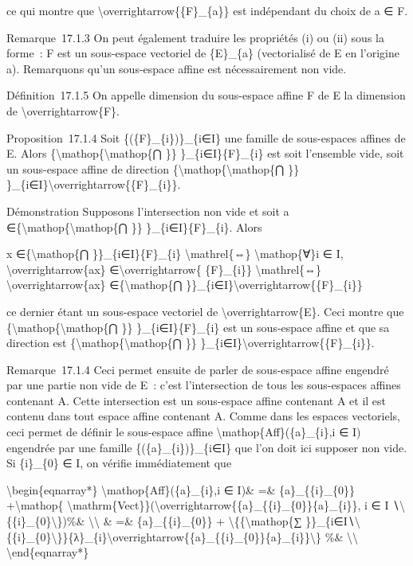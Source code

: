\documentclass[]{article}
\begin{document}
ce qui montre que \textbackslash{}overrightarrow\{\{F\}\_\{a\}\} est
indépendant du choix de a ∈ F.

Remarque~17.1.3 On peut également traduire les propriétés (i) ou (ii)
sous la forme~: F est un sous-espace vectoriel de \{E\}\_\{a\}
(vectorialisé de E en l'origine a). Remarquons qu'un sous-espace affine
est nécessairement non vide.

Définition~17.1.5 On appelle dimension du sous-espace affine F de E la
dimension de \textbackslash{}overrightarrow\{F\}.

Proposition~17.1.4 Soit \{(\{F\}\_\{i\})\}\_\{i∈I\} une famille de
sous-espaces affines de E. Alors
\{\textbackslash{}mathop\{\textbackslash{}mathop\{⋂ \}\}
\}\_\{i∈I\}\{F\}\_\{i\} est soit l'ensemble vide, soit un sous-espace
affine de direction \{\textbackslash{}mathop\{\textbackslash{}mathop\{⋂
\}\} \}\_\{i∈I\}\textbackslash{}overrightarrow\{\{F\}\_\{i\}\}.

Démonstration Supposons l'intersection non vide et soit a
∈\{\textbackslash{}mathop\{\textbackslash{}mathop\{⋂ \}\}
\}\_\{i∈I\}\{F\}\_\{i\}. Alors

x ∈\{\textbackslash{}mathop\{⋂ \}\}\_\{i∈I\}\{F\}\_\{i\}
\textbackslash{}mathrel\{⇔\} \textbackslash{}mathop\{∀\}i ∈ I,
\textbackslash{}overrightarrow\{ax\} ∈\textbackslash{}overrightarrow\{
\{F\}\_\{i\}\} \textbackslash{}mathrel\{⇔\}
\textbackslash{}overrightarrow\{ax\} ∈\{\textbackslash{}mathop\{⋂
\}\}\_\{i∈I\}\textbackslash{}overrightarrow\{\{F\}\_\{i\}\}

ce dernier étant un sous-espace vectoriel de
\textbackslash{}overrightarrow\{E\}. Ceci montre que
\{\textbackslash{}mathop\{\textbackslash{}mathop\{⋂ \}\}
\}\_\{i∈I\}\{F\}\_\{i\} est un sous-espace affine et que sa direction
est \{\textbackslash{}mathop\{\textbackslash{}mathop\{⋂ \}\}
\}\_\{i∈I\}\textbackslash{}overrightarrow\{\{F\}\_\{i\}\}.

Remarque~17.1.4 Ceci permet ensuite de parler de sous-espace affine
engendré par une partie non vide de E~: c'est l'intersection de tous les
sous-espaces affines contenant A. Cette intersection est un sous-espace
affine contenant A et il est contenu dans tout espace affine contenant
A. Comme dans les espaces vectoriels, ceci permet de définir le
sous-espace affine \textbackslash{}mathop\{Aff\}(\{a\}\_\{i\},i ∈ I)
engendrée par une famille \{(\{a\}\_\{i\})\}\_\{i∈I\} que l'on doit ici
supposer non vide. Si \{i\}\_\{0\} ∈ I, on vérifie immédiatement que

\textbackslash{}begin\{eqnarray*\}
\textbackslash{}mathop\{Aff\}(\{a\}\_\{i\},i ∈ I)\& =\&
\{a\}\_\{\{i\}\_\{0\}\} +\textbackslash{}mathop\{
\textbackslash{}mathrm\{Vect\}\}(\textbackslash{}overrightarrow\{\{a\}\_\{\{i\}\_\{0\}\}\{a\}\_\{i\}\},
i ∈ I ∖\textbackslash{}\{\{i\}\_\{0\}\textbackslash{}\})\%\&
\textbackslash{}\textbackslash{} \& =\& \{a\}\_\{\{i\}\_\{0\}\} +
\textbackslash{}\{\{\textbackslash{}mathop\{∑
\}\}\_\{i∈I∖\textbackslash{}\{\{i\}\_\{0\}\textbackslash{}\}\}\{λ\}\_\{i\}\textbackslash{}overrightarrow\{\{a\}\_\{\{i\}\_\{0\}\}\{a\}\_\{i\}\}\textbackslash{}\}
\%\& \textbackslash{}\textbackslash{} \textbackslash{}end\{eqnarray*\}
\end{document}
